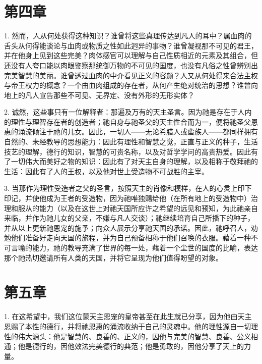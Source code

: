 
\section{第四章}

1. 然而，人从何处获得这种知识？谁曾将这些真理传达到凡人的耳中？属血肉的舌头从何得能谈论与血肉或物质之性如此迥异的事物？谁曾凝视那不可见的君王，并在他身上见到这些完美？肉体感官可以理解与自己性质相近的元素及其组合，但还没有人夸口能以肉眼鉴察那统御万物的不可见的国度，也没有凡俗之性曾辨别出完美智慧的美丽。谁曾透过血肉的中介看见正义的容颜？人又从何处得来合法主权与帝王权力的概念？一个由血肉组成的存在者，从何产生绝对统治的思想？谁曾向地上的凡人宣告那些不可见、无界定、没有外形的无形实体？\par

2. 诚然，这些事只有一位解释者：那遍及万有的天主圣言。因为祂是存在于人内的理性与理智存在者的创造者；祂自身与祂圣父的天主性合而为一，便将祂圣父恩惠的涌流倾注于祂的儿女。因此，一切人——无论希腊人或蛮族人——都同样拥有自然的、未经教导的思想能力：因此有理性和智慧之觉，正直与正义的种子，生活技艺的理解，德行的知识，智慧的可贵名称，以及对哲学学问的高贵热爱。因此有了一切伟大而美好之物的知识：因此有了对天主自身的理解，以及相称于敬拜祂的生活：因此有了人的王权，以及他对世上受造物不可战胜的主宰。\par

3. 当那作为理性受造者之父的圣言，按照天主的肖像和模样，在人的心灵上印下印记，并使他成为王者的受造物，因为祂唯独赐给他（在所有地上的受造物中）治理和服从的能力（以及在这世上对祂天国所应许之希望的远见和预知，为此祂亲自来临，并作为祂儿女的父亲，不嫌与凡人交谈）；祂继续培育自己所播下的种子，并从以上更新祂恩宠的施予；向众人展示分享祂天国的承诺。因此，祂呼召人，劝勉他们准备好走向天国的旅程，并为自己预备相称于他们召唤的衣服。藉着一种不可言喻的能力，祂的教导充满了世界的每一处，藉着一个尘世的国度的比喻，表达那个祂热切邀请所有人类的天国，并将它呈现为他们值得盼望的对象。\par


\section{第五章}

1. 在这希望中，我们这位蒙天主恩宠的皇帝甚至在此生就已分享，因为他由天主恩赐了本性的德行，并将祂恩惠的涌流收纳于自己的灵魂中。他的理性源自一切理性的伟大源头：他是智慧的、良善的、正义的，因他与完美的智慧、良善、公义相通；他是德行的，因他效法完美德行的典范；他是勇敢的，因他分享了天上的力量。\par

